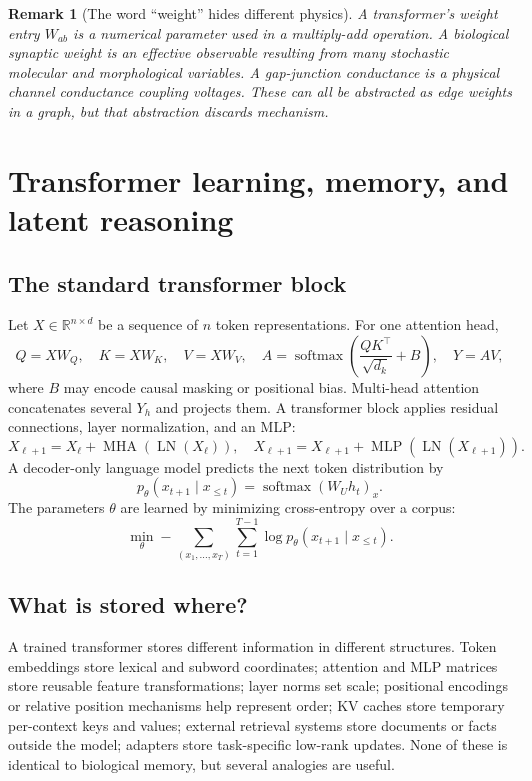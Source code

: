 \documentclass[11pt]{article}
\newtheorem{remark}[definition]{Remark}
\newcommand{\R}{\mathbb{R}}
\newcommand{\softmax}{\operatorname{softmax}}
\newcommand{\1}{\mathbf{1}}
\begin{document}
\begin{remark}[The word ``weight'' hides different physics]
A transformer's weight entry $W_{ab}$ is a numerical parameter used in a multiply-add operation. A biological synaptic weight is an effective observable resulting from many stochastic molecular and morphological variables. A gap-junction conductance is a physical channel conductance coupling voltages. These can all be abstracted as edge weights in a graph, but that abstraction discards mechanism.
\end{remark}

\section{Transformer learning, memory, and latent reasoning}

\subsection{The standard transformer block}

Let $X\in\R^{n\times d}$ be a sequence of $n$ token representations. For one attention head,
\[
Q=XW_Q,
\quad K=XW_K,
\quad V=XW_V,
\quad A=\softmax\left(\frac{QK^\top}{\sqrt{d_k}}+B\right),
\quad Y=AV,
\]
where $B$ may encode causal masking or positional bias. Multi-head attention concatenates several $Y_h$ and projects them. A transformer block applies residual connections, layer normalization, and an MLP:
\[
X_{\ell+1}=X_\ell+\operatorname{MHA}(\operatorname{LN}(X_\ell)),
\quad
X_{\ell+1}=X_{\ell+1}+\operatorname{MLP}(\operatorname{LN}(X_{\ell+1})).
\]
A decoder-only language model predicts the next token distribution by
\[
p_\theta(x_{t+1}\mid x_{\le t})=\softmax(W_U h_t)_x.
\]
The parameters $\theta$ are learned by minimizing cross-entropy over a corpus:
\[
\min_\theta -\sum_{(x_1,\dots,x_T)}\sum_{t=1}^{T-1}\log p_\theta(x_{t+1}\mid x_{\le t}).
\]

\subsection{What is stored where?}

A trained transformer stores different information in different structures. Token embeddings store lexical and subword coordinates; attention and MLP matrices store reusable feature transformations; layer norms set scale; positional encodings or relative position mechanisms help represent order; KV caches store temporary per-context keys and values; external retrieval systems store documents or facts outside the model; adapters store task-specific low-rank updates. None of these is identical to biological memory, but several analogies are useful.
\end{document}
